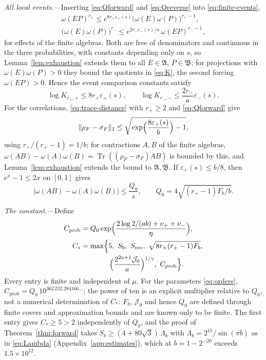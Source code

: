 \documentclass[aps,prl,reprint,longbibliography,raggedbottom]{revtex4-2}
\newcommand{\norm}[1]{\lVert #1\rVert}
\newcommand{\abs}[1]{\lvert #1\rvert}
\DeclareMathOperator{\Tr}{Tr}
\newcommand{\A}{\mathfrak A}
\newcommand{\B}{\mathfrak B}
\begin{document}
\emph{All local events.---}Inserting \eqref{eq:Qforward} and
\eqref{eq:Qreverse} into \eqref{eq:finite-events},
\begin{equation}
\begin{gathered}
\omega(EP)^{r_+}\le e^{8r_+\varepsilon_+(s)}
\bigl(\omega(E)\omega(P)\bigr)^{r_+-1},\\
\bigl(\omega(E)\omega(P)\bigr)^{r_-}\le e^{2r_-\varepsilon_-(s)/a}\,
\omega(EP)^{r_--1},
\end{gathered}
\label{eq:events}
\end{equation}
for effects of the finite algebras. Both are free of denominators and
continuous in the three probabilities, with constants depending only
on $s$, so Lemma~\ref{lem:exhaustion} extends them to all $E\in\A$,
$P\in\B$; for projections with $\omega(E)\omega(P)>0$ they bound the
quotients in \eqref{eq:K}, the second forcing $\omega(EP)>0$. Hence
the event comparison constants satisfy
\begin{equation}
\log K_{r_+,+}\le8r_+\varepsilon_+(s),\qquad
\log K_{r_-,-}\le\frac{2r_-}a\varepsilon_-(s).
\label{eq:full-K}
\end{equation}
For the correlations, \eqref{eq:trace-distance} with $r_+\ge2$ and
\eqref{eq:Qforward} give
\[
\norm{\rho_F-\sigma_F}_1\le\sqrt{\exp\Bigl(\frac{8\varepsilon_+(s)}b\Bigr)-1},
\]
using $r_+/(r_+-1)=1/b$; for contractions $A,B$ of the finite
algebras, $\omega(AB)-\omega(A)\omega(B)=\Tr((\rho_F-\sigma_F)AB)$ is
bounded by this, and Lemma~\ref{lem:exhaustion} extends the bound to
$\A,\B$. If $\varepsilon_+(s)\le b/8$, then $e^x-1\le2x$ on $[0,1]$
gives
\begin{equation}
\abs{\omega(AB)-\omega(A)\omega(B)}\le\frac{Q_0}s,\qquad
Q_0=4\sqrt{(r_+-1)F_b/b}.
\label{eq:cluster}
\end{equation}

\emph{The constant.---}Define
\begin{align}
C_{\mathrm{prob}}&=Q_0\exp\Bigl(\frac{2\log2/(ab)+\nu_++\nu_-}{\eta}\Bigr),
\label{eq:Cprob}\\
C_*&=\max\Bigl\{5,\ S_b,\ S_{\mathrm{rev}},\ \sqrt{8r_+(r_+-1)F_b},
\nonumber\\
&\qquad\qquad
\Bigl(\frac{2^{2a+1}\mathcal J_0}{a}\Bigr)^{1/\gamma},\ C_{\mathrm{prob}}\Bigr\}.
\label{eq:Cstar}
\end{align}
Every entry is finite and independent of $\mu$. For the parameters
\eqref{eq:orders}, $C_{\mathrm{prob}}=Q_0\,10^{362\,232.284166\ldots}$;
the power of ten is an explicit multiplier relative to $Q_0$, not
a numerical determination of $C_*$:
$F_b$, $\mathcal J_0$ and hence $Q_0$ are defined through finite
covers and approximation bounds and are known only to be finite. The
first entry gives $C_*\ge5>2$ independently of $Q_0$, and the proof of
Theorem~\ref{thm:forward} takes
$S_b\ge(4+80\sqrt3)\,\Lambda_b$ with
$\Lambda_b=2^{15}/\sin(\pi b)$ as in \eqref{eq:Lambda}
(Appendix~\ref{app:estimates}), which at $b=1-2^{-20}$ exceeds
$1.5\times10^{12}$.
\end{document}
